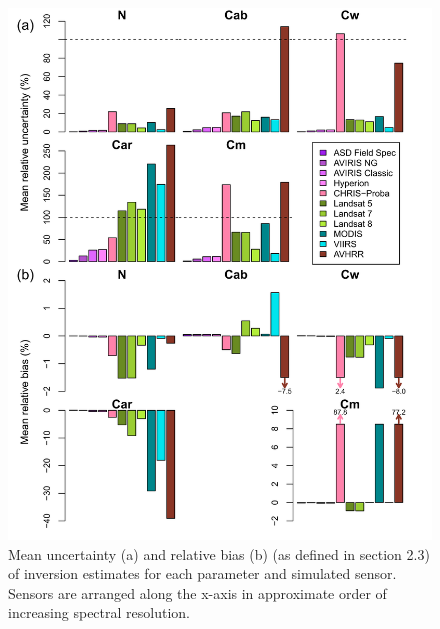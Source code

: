 \begin{figure}
  \centering
  \includegraphics[width=\textwidth]{2_rtm_inversion/figures/mean_error.png}
  \caption{%
    Mean uncertainty (a) and relative bias (b) (as defined in section 2.3) of inversion estimates for each parameter and simulated sensor.
    Sensors are arranged along the x-axis in approximate order of increasing spectral resolution.
  }\label{fig:pecanrtm-sensorerror}
\end{figure}


